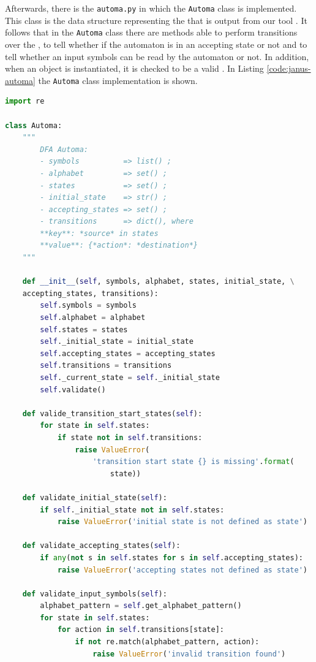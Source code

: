 Afterwards, there is the \texttt{automa.py} in which the \texttt{Automa} class is implemented. This class is the data structure representing the \DFA that is output from our tool \LTLfToDFA. It follows that in the \texttt{Automa} class there are methods able to perform transitions over the \DFA, to tell whether if the automaton is in an accepting state or not and to tell whether an input symbols can be read by the automaton or not. In addition, when an object is instantiated, it is checked to be a valid \DFA. In Listing \ref{code:janus-automa} the \texttt{Automa} class implementation is shown.
\begin{lstlisting}[language=Python, style=Python, escapechar = £, label={code:janus-automa}, caption={The \texttt{automa.py} module}]
import re

class Automa:
    """
        DFA Automa:
        - symbols          => list() ;
        - alphabet         => set() ;
        - states           => set() ;
        - initial_state    => str() ;
        - accepting_states => set() ;
        - transitions      => dict(), where
        **key**: *source* in states
        **value**: {*action*: *destination*}
    """

    def __init__(self, symbols, alphabet, states, initial_state, \
    accepting_states, transitions):
        self.symbols = symbols
        self.alphabet = alphabet
        self.states = states
        self._initial_state = initial_state
        self.accepting_states = accepting_states
        self.transitions = transitions
        self._current_state = self._initial_state
        self.validate()

    def valide_transition_start_states(self):
        for state in self.states:
            if state not in self.transitions:
                raise ValueError(
                    'transition start state {} is missing'.format(
                        state))

    def validate_initial_state(self):
        if self._initial_state not in self.states:
            raise ValueError('initial state is not defined as state')

    def validate_accepting_states(self):
        if any(not s in self.states for s in self.accepting_states):
            raise ValueError('accepting states not defined as state')

    def validate_input_symbols(self):
        alphabet_pattern = self.get_alphabet_pattern()
        for state in self.states:
            for action in self.transitions[state]:
                if not re.match(alphabet_pattern, action):
                    raise ValueError('invalid transition found')


\end{lstlisting}
